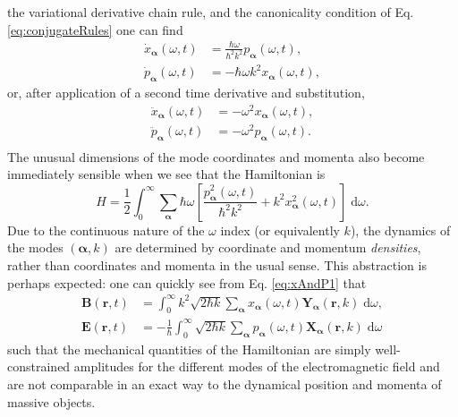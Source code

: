\documentclass{article}
\numberwithin{equation}{section}
\begin{document}
the variational derivative chain rule, and the canonicality condition of Eq. \eqref{eq:conjugateRules} one can find
\begin{equation}\label{eq:eqMot1}
\begin{split}
\dot{x}_{\bm{\alpha}}(\omega,t) &= \frac{\hbar\omega}{\hbar^2k^2}p_{\bm{\alpha}}(\omega,t),\\
\dot{p}_{\bm{\alpha}}(\omega,t) &= -\hbar\omega k^2x_{\bm{\alpha}}(\omega,t),
\end{split}
\end{equation}
or, after application of a second time derivative and substitution,
\begin{equation}\label{eq:eqMot2}
\begin{split}
\ddot{x}_{\bm{\alpha}}(\omega,t) &= -\omega^2x_{\bm{\alpha}}(\omega,t),\\
\ddot{p}_{\bm{\alpha}}(\omega,t) &= -\omega^2p_{\bm{\alpha}}(\omega,t).\\
\end{split}
\end{equation}
The unusual dimensions of the mode coordinates and momenta also become immediately sensible when we see that the Hamiltonian is 
\begin{equation}\label{eq:H2}
H = \frac{1}{2}\int_0^{\infty}\sum_{\bm{\alpha}}\hbar\omega\left[\frac{p_{\bm{\alpha}}^2(\omega,t)}{\hbar^2k^2} + k^2x_{\bm{\alpha}}^2(\omega,t)\right]\;\mathrm{d}\omega.
\end{equation}
Due to the continuous nature of the $\omega$ index (or equivalently $k$), the dynamics of the modes $(\bm{\alpha},k)$ are determined by coordinate and momentum \textit{densities}, rather than coordinates and momenta in the usual sense. This abstraction is perhaps expected: one can quickly see from Eq. \eqref{eq:xAndP1} that
\begin{equation}
\begin{split}
\mathbf{B}(\mathbf{r},t) &= \int_0^\infty k^2\sqrt{2\hbar k}\sum_{\bm{\alpha}}x_{\bm{\alpha}}(\omega,t)\mathbf{Y}_{\bm{\alpha}}(\mathbf{r},k)\;\mathrm{d}\omega,\\
\mathbf{E}(\mathbf{r},t) &= -\frac{1}{\hbar}\int_0^\infty\sqrt{2\hbar k}\sum_{\bm{\alpha}}p_{\bm{\alpha}}(\omega,t)\mathbf{X}_{\bm{\alpha}}(\mathbf{r},k)\;\mathrm{d}\omega
\end{split}
\end{equation}
such that the mechanical quantities of the Hamiltonian are simply well-constrained amplitudes for the different modes of the electromagnetic field and are not comparable in an exact way to the dynamical position and momenta of massive objects.
\end{document}
